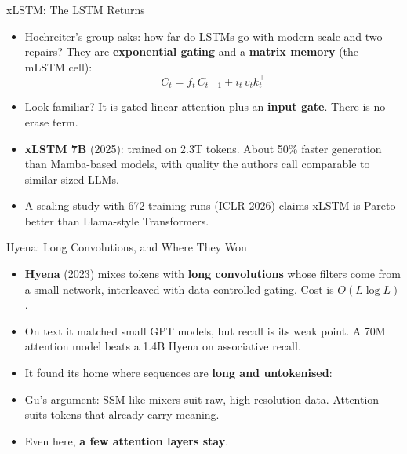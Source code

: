 \begin{frame}{xLSTM: The LSTM Returns}
    \begin{itemize}\itemsep0.45em
        \item Hochreiter's group asks: how far do LSTMs go with modern scale and two repairs?
        They are \textbf{exponential gating} and a \textbf{matrix memory} (the mLSTM cell):
        \[
            C_t=f_t\,C_{t-1}+i_t\,v_tk_t^\top
        \]
        \item Look familiar? It is gated linear attention plus an \textbf{input gate}. There is no erase term.
        \item \textbf{xLSTM 7B} (2025): trained on 2.3T tokens. About 50\% faster generation than Mamba-based models, with quality the authors call comparable to similar-sized LLMs.
        \item A scaling study with 672 training runs (ICLR 2026) claims xLSTM is Pareto-better than Llama-style Transformers.
    \end{itemize}
\end{frame}

\begin{frame}{Hyena: Long Convolutions, and Where They Won}
    \begin{itemize}\itemsep0.3em
        \item \textbf{Hyena} (2023) mixes tokens with \textbf{long convolutions} whose filters come from a small network, interleaved with data-controlled gating. Cost is $O(L\log L)$.
        \item On text it matched small GPT models, but recall is its weak point. A 70M attention model beats a 1.4B Hyena on associative recall.
        \item It found its home where sequences are \textbf{long and untokenised}:
    \end{itemize}
    \vspace{0.1em}
    \begin{itemize}\itemsep0.3em
        \item Gu's argument: SSM-like mixers suit raw, high-resolution data. Attention suits tokens that already carry meaning.
        \item Even here, \textbf{a few attention layers stay}.
    \end{itemize}
\end{frame}
